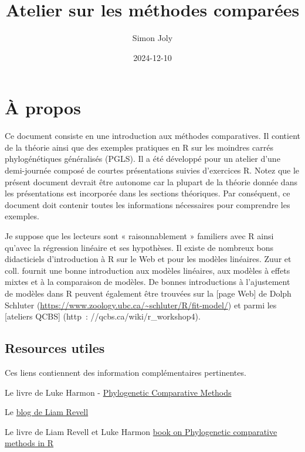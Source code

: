 \documentclass[
]{book}
\title{Atelier sur les méthodes comparées}
\author{Simon Joly}
\date{2024-12-10}
\begin{document}
\maketitle

{
\setcounter{tocdepth}{1}
\tableofcontents
}
\chapter{À propos}\label{uxe0-propos}

Ce document consiste en une introduction aux méthodes comparatives. Il contient de la théorie ainsi que des exemples pratiques en R sur les moindres carrés phylogénétiques généralisés (PGLS). Il a été développé pour un atelier d'une demi-journée composé de courtes présentations suivies d'exercices R. Notez que le présent document devrait être autonome car la plupart de la théorie donnée dans les présentations est incorporée dans les sections théoriques. Par conséquent, ce document doit contenir toutes les informations nécessaires pour comprendre les exemples.

Je suppose que les lecteurs sont « raisonnablement » familiers avec R ainsi qu'avec la régression linéaire et ses hypothèses. Il existe de nombreux bons didacticiels d'introduction à R sur le Web et pour les modèles linéaires. Zuur et coll. \citep{zuur2007analysing} fournit une bonne introduction aux modèles linéaires, aux modèles à effets mixtes et à la comparaison de modèles. De bonnes introductions à l'ajustement de modèles dans R peuvent également être trouvées sur la {[}page Web{]} de Dolph Schluter (\url{https://www.zoology.ubc.ca/~schluter/R/fit-model/}) et parmi les {[}ateliers QCBS{]} (http~: //qcbs.ca/wiki/r\_workshop4).

\section{Resources utiles}\label{resources-utiles}

Ces liens contiennent des information complémentaires pertinentes.

Le livre de Luke Harmon - \href{https://lukejharmon.github.io/pcm/}{Phylogenetic Comparative Methods}

Le \href{http://blog.phytools.org/}{blog de Liam Revell}

Le livre de Liam Revell et Luke Harmon \href{https://press.princeton.edu/books/ebook/9780691219042/phylogenetic-comparative-methods-in-r}{book on Phylogenetic comparative methods in R}
\end{document}
